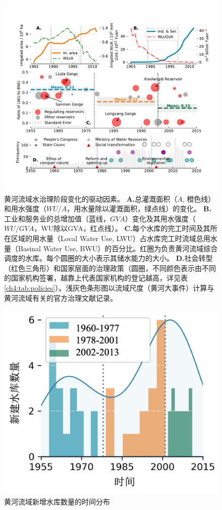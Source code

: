 

\begin{figure}[th!]
	\centering
	\includegraphics[width=\textwidth]{img/ch4/causes.pdf}
	\caption[黄河流域水治理阶段变化的驱动因素]{
		黄河流域水治理阶段变化的驱动因素。
		\textbf{A.}总灌溉面积（$A$, 橙色线）和用水强度（$WU/A$，用水量除以灌溉面积，绿点线）的变化。
        \textbf{B.}工业和服务业的总增加值（蓝线，$GVA$）变化及其用水强度（$WU/GVA$，WU除以GVA，红点线）。
        \textbf{C.}每个水库的完工时间及其所在区域的用水量（Local Water Use, LWU）占水库完工时流域总用水量（Basinal Water Use, BWU）的百分比。红圈为负责黄河流域综合调度的水库。每个圆圈的大小表示其储水能力的大小。
        \textbf{D.}社会转型（红色三角形）和国家层面的治理政策（圆圈，不同颜色表示由不同的国家机构签署，越靠上代表国家机构的登记越高，详见表\ref{ch4:tab:policies}）。浅灰色条形图以流域尺度（黄河大事件）计算与黄河流域有关的官方治理文献记录。}\label{ch4:fig:mechanism}
\end{figure}


\begin{figure}[tb]
    \centering
    \includegraphics[width=0.6\linewidth]{img/ch4/ch4_reservoirs.png}
    \caption{黄河流域新增水库数量的时间分布}\label{ch4:fig:reservoirs}
\end{figure}


